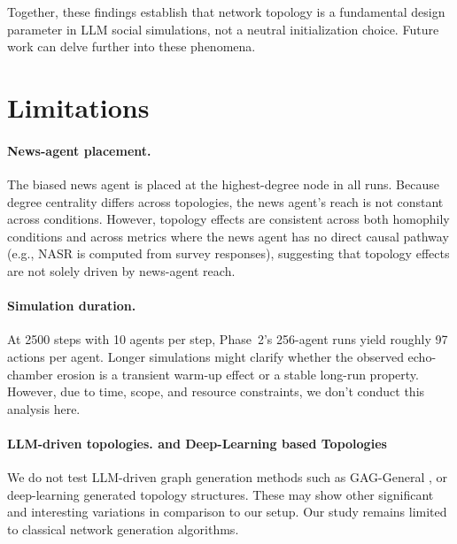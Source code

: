\documentclass[11pt]{article}
\begin{document}
Together, these findings establish that network topology is a fundamental design parameter in LLM social simulations, not a neutral initialization choice. Future work can delve further into these phenomena.

\section{Limitations}


\paragraph{News-agent placement.} The biased news agent is placed at the highest-degree node in all runs. Because degree centrality differs across topologies, the news agent's reach is not constant across conditions. However, topology effects are consistent across both homophily conditions and across metrics where the news agent has no direct causal pathway (e.g., NASR is computed from survey responses), suggesting that topology effects are not solely driven by news-agent reach.

\paragraph{Simulation duration.} At 2500 steps with 10 agents per step, Phase~2's 256-agent runs yield roughly 97 actions per agent. Longer simulations might clarify whether the observed echo-chamber erosion is a transient warm-up effect or a stable long-run property. However, due to time, scope, and resource constraints, we don't conduct this analysis here.

\paragraph{LLM-driven topologies. and Deep-Learning based Topologies} We do not test LLM-driven graph generation methods such as GAG-General \cite{peng2026gdgb}, or deep-learning generated topology structures. These may show other significant and interesting variations in comparison to our setup. Our study remains limited to classical network generation algorithms.
\end{document}
